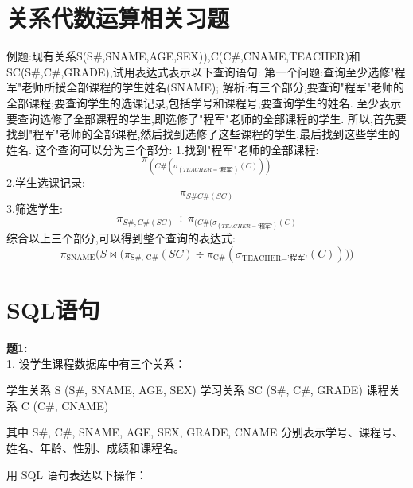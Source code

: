 \documentclass[a4paper,12pt,UTF8]{ctexart}
\begin{document}
\section{关系代数运算相关习题}
例题:现有关系S(S\#,SNAME,AGE,SEX)),C(C\#,CNAME,TEACHER)和SC(S\#,C\#,GRADE),试用表达式表示以下查询语句:
第一个问题:查询至少选修"程军"老师所授全部课程的学生姓名(SNAME);
解析:有三个部分,要查询"程军"老师的全部课程;要查询学生的选课记录,包括学号和课程号;要查询学生的姓名.
至少表示要查询选修了全部课程的学生,即选修了"程军"老师的全部课程的学生.
所以,首先要找到"程军"老师的全部课程,然后找到选修了这些课程的学生,最后找到这些学生的姓名.
这个查询可以分为三个部分:
1.找到"程军"老师的全部课程:\\
\begin{equation}
    \pi_{(C\#(\sigma_(TEACHER='\text{程军}')(C)))}
\end{equation}
2.学生选课记录:\\
\begin{equation}
    \pi_{S\# C\#(SC)}
\end{equation}
3.筛选学生:
\begin{equation}
    {\pi_{S\#,C\#(SC)}}\div{\pi_{(C\#(\sigma_(TEACHER='\text{程军}')(C)}}
\end{equation}
综合以上三个部分,可以得到整个查询的表达式:\\
\begin{equation}
    \pi_{\text{SNAME}} \Big( S \Join \big( \pi_{\text{S\#, C\#}}(SC) \div \pi_{\text{C\#}}( \sigma_{\text{TEACHER='程军'}}(C) ) \big) \Big)
\end{equation}
 
\section{SQL语句}
\textbf{题1:}\\
1. 设学生课程数据库中有三个关系：

   学生关系 S (S\#, SNAME, AGE, SEX)
    学习关系 SC (S\#, C\#, GRADE)
   课程关系 C (C\#, CNAME)

   其中 S\#, C\#, SNAME, AGE, SEX, GRADE, CNAME 分别表示学号、课程号、姓名、年龄、性别、成绩和课程名。

用 SQL 语句表达以下操作：
\end{document}
